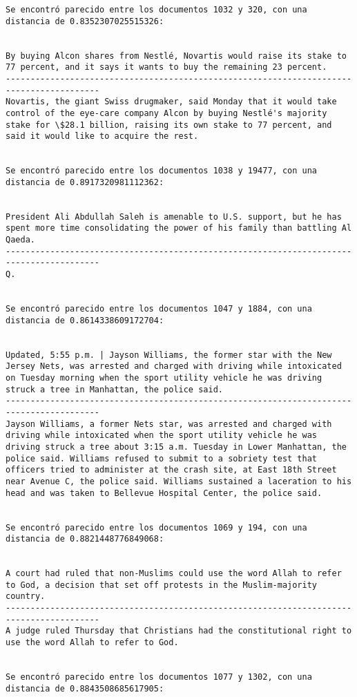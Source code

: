 \documentclass[11pt]{article}
\begin{document}
\begin{Verbatim}[commandchars=\\\{\}]
Se encontró parecido entre los documentos 1032 y 320, con una distancia de 0.8352307025515326:


By buying Alcon shares from Nestlé, Novartis would raise its stake to 77 percent, and it says it wants to buy the remaining 23 percent.
-----------------------------------------------------------------------------------------
Novartis, the giant Swiss drugmaker, said Monday that it would take control of the eye-care company Alcon by buying Nestlé's majority stake for \$28.1 billion, raising its own stake to 77 percent, and said it would like to acquire the rest.


Se encontró parecido entre los documentos 1038 y 19477, con una distancia de 0.8917320981112362:


President Ali Abdullah Saleh is amenable to U.S. support, but he has spent more time consolidating the power of his family than battling Al Qaeda.
-----------------------------------------------------------------------------------------
Q.


Se encontró parecido entre los documentos 1047 y 1884, con una distancia de 0.8614338609172704:


Updated, 5:55 p.m. | Jayson Williams, the former star with the New Jersey Nets, was arrested and charged with driving while intoxicated on Tuesday morning when the sport utility vehicle he was driving struck a tree in Manhattan, the police said.
-----------------------------------------------------------------------------------------
Jayson Williams, a former Nets star, was arrested and charged with driving while intoxicated when the sport utility vehicle he was driving struck a tree about 3:15 a.m. Tuesday in Lower Manhattan, the police said. Williams refused to submit to a sobriety test that officers tried to administer at the crash site, at East 18th Street near Avenue C, the police said. Williams sustained a laceration to his head and was taken to Bellevue Hospital Center, the police said.


Se encontró parecido entre los documentos 1069 y 194, con una distancia de 0.8821448776849068:


A court had ruled that non-Muslims could use the word Allah to refer to God, a decision that set off protests in the Muslim-majority country.
-----------------------------------------------------------------------------------------
A judge ruled Thursday that Christians had the constitutional right to use the word Allah to refer to God.


Se encontró parecido entre los documentos 1077 y 1302, con una distancia de 0.8843508685617905:



\end{Verbatim}
\end{document}
